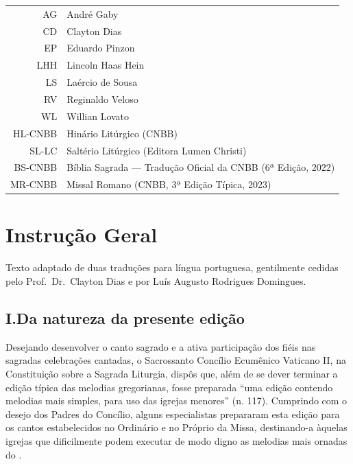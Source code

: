 \begin{center}
  \begin{tabular}{rl}
    AG      & André Gaby                                                    \\
    CD      & Clayton Dias                                                  \\
    EP      & Eduardo Pinzon                                                \\
    LHH     & Lincoln Haas Hein                                             \\
    LS      & Laércio de Sousa                                              \\
    RV      & Reginaldo Veloso                                              \\
    WL      & Willian Lovato                                                \\
    HL-CNBB & Hinário Litúrgico (CNBB)                                      \\
    SL-LC   & Saltério Litúrgico (Editora Lumen Christi)                    \\
    BS-CNBB & Bíblia Sagrada --- Tradução Oficial da CNBB (6ª Edição, 2022) \\
    MR-CNBB & Missal Romano (CNBB, 3ª Edição Típica, 2023)                  \\
  \end{tabular}
\end{center}

\AllowPageFlush

\section*{Instrução Geral}\label{section:praenotanda}

\begin{center}
  \begin{rubrica}
    Texto adaptado de duas traduções para língua portuguesa, gentilmente cedidas pelo Prof.\ Dr.\ Clayton Dias e por Luís Augusto Rodrigues Domingues.
  \end{rubrica}
\end{center}

\subsection*{I.\@ Da natureza da presente edição}\label{subsection*:praenotanda-1}

 Desejando desenvolver o canto sagrado e a ativa participação dos fiéis nas sagradas celebrações cantadas, o Sacrossanto Concílio Ecumênico Vaticano II, na Constituição sobre a Sagrada Liturgia, dispôs que, além de se dever terminar a edição típica das melodias gregorianas, fosse preparada ``uma edição contendo melodias mais simples, para uso das igrejas menores'' (n. 117). Cumprindo com o desejo dos Padres do Concílio, alguns especialistas prepararam esta edição para os cantos estabelecidos no  Ordinário e no Próprio da Missa, destinando-a àquelas igrejas que dificilmente podem executar de modo digno as melodias mais ornadas do {\GR}.

